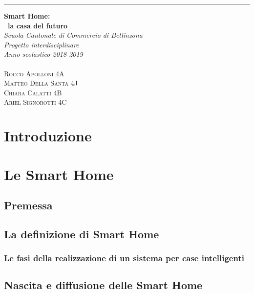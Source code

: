 \documentclass{article}
\begin{document}
\begin{titlepage}
	
	\raggedleft 
	
	\rule{1pt}{\textheight} 
	\hspace{0.05\textwidth}
	\parbox[b]{0.75\textwidth}{ 
		
		{\Huge\bfseries Smart Home: \\[0.5\baselineskip] ~la casa del futuro}\\[2\baselineskip]
		{\large\textit{Scuola Cantonale di Commercio di Bellinzona \\
Progetto interdisciplinare \\ 
Anno scolastico 2018-2019 \\
}}\\[4\baselineskip] 
		{\Large\textsc{Rocco Apolloni 4A \\
Matteo Della Santa 4J \\
Chiara Calatti 4B \\
Ariel Signorotti 4C 
}} 
		\vspace{0.5\textheight} 
		{\noindent~~}\\[\baselineskip]}

    \end{titlepage}
    
\newpage
\tableofcontents
\thispagestyle{empty}
\newpage

\section{Introduzione}

\newpage
\section{Le Smart Home}

\subsection{Premessa}

\subsection{La definizione di Smart Home}

\subsubsection{Le fasi della realizzazione di un sistema per case intelligenti}

\subsection{Nascita e diffusione delle Smart Home}

\end{document}
